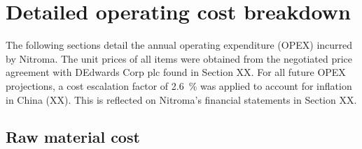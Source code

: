 \section{Detailed operating cost breakdown}
The following sections detail the annual operating expenditure (OPEX) incurred by Nitroma. The unit prices of all items were obtained from the negotiated price agreement with DEdwards Corp plc found in Section XX. For all future OPEX projections, a cost escalation factor of \SI{2.6}{\percent} was applied to account for inflation in China (XX). This is reflected on Nitroma’s financial statements in Section XX.

\subsection{Raw material cost}
\label{sec:opex-raw-material}

